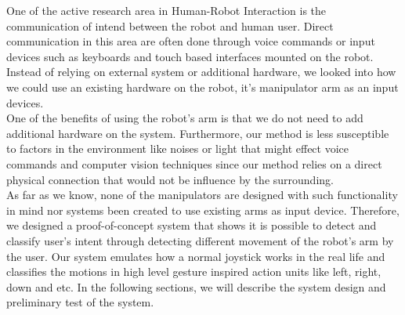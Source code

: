 One of the active research area in Human-Robot Interaction is the communication of intend between the robot and human user. Direct communication in this area are often done through voice commands or input devices such as keyboards and touch based interfaces mounted on the robot. Instead of relying on external system or additional hardware, we looked into how we could use an existing hardware on the robot, it's manipulator arm as an input devices.\\
One of the benefits of using the robot's arm is that we do not need to add additional hardware on the system. Furthermore, our method is less susceptible to factors in the environment like noises or light that might effect voice commands and computer vision techniques since our method relies on a direct physical connection that would not be influence by the surrounding.\\
As far as we know, none of the manipulators are designed with such functionality in mind nor systems been created to use existing arms as input device. Therefore, we designed a proof-of-concept system that shows it is possible to detect and classify user's intent through detecting different movement of the robot's arm by the user. Our system emulates how a normal joystick works in the real life and classifies the motions in high level gesture inspired action units like left, right, down and etc. In the following sections, we will describe the system design and preliminary test of the system.